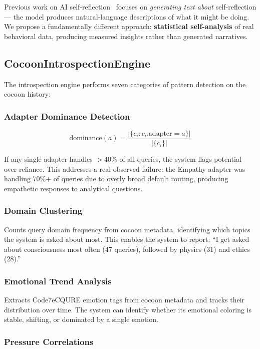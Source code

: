 Previous work on AI self-reflection~\cite{shinn2023reflexion} focuses on
\emph{generating text about} self-reflection --- the model produces
natural-language descriptions of what it might be doing. We propose a
fundamentally different approach: \textbf{statistical self-analysis} of real
behavioral data, producing measured insights rather than generated narratives.

\subsection{CocoonIntrospectionEngine}

The introspection engine performs seven categories of pattern detection on
the cocoon history:

\subsubsection{Adapter Dominance Detection}

\begin{equation}
\text{dominance}(a) = \frac{|\{c_i : c_i.\text{adapter} = a\}|}{|\{c_i\}|}
\end{equation}

If any single adapter handles $>40\%$ of all queries, the system flags
potential over-reliance. This addresses a real observed failure: the Empathy
adapter was handling 70\%+ of queries due to overly broad default routing,
producing empathetic responses to analytical questions.

\subsubsection{Domain Clustering}

Counts query domain frequency from cocoon metadata, identifying which topics
the system is asked about most. This enables the system to report: ``I get
asked about consciousness most often (47 queries), followed by physics (31)
and ethics (28).''

\subsubsection{Emotional Trend Analysis}

Extracts Code7eCQURE emotion tags from cocoon metadata and tracks their
distribution over time. The system can identify whether its emotional
coloring is stable, shifting, or dominated by a single emotion.

\subsubsection{Pressure Correlations}

